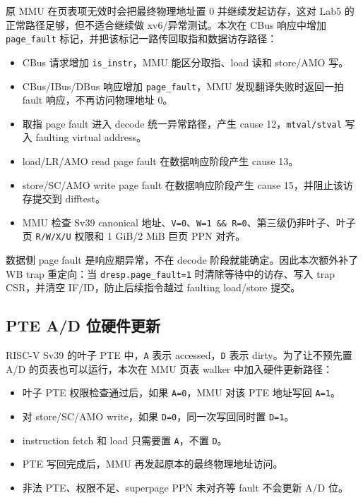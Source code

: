 \documentclass[UTF8,a4paper,11pt]{ctexart}
\begin{document}
原 MMU 在页表项无效时会把最终物理地址置 0 并继续发起访存，这对 Lab5 的正常路径足够，但不适合继续做 xv6/异常测试。本次在 CBus 响应中增加 \texttt{page\_fault} 标记，并把该标记一路传回取指和数据访存路径：

\begin{itemize}
  \item CBus 请求增加 \texttt{is\_instr}，MMU 能区分取指、load 读和 store/AMO 写。
  \item CBus/IBus/DBus 响应增加 \texttt{page\_fault}，MMU 发现翻译失败时返回一拍 fault 响应，不再访问物理地址 0。
  \item 取指 page fault 进入 decode 统一异常路径，产生 cause 12，\texttt{mtval/stval} 写入 faulting virtual address。
  \item load/LR/AMO read page fault 在数据响应阶段产生 cause 13。
  \item store/SC/AMO write page fault 在数据响应阶段产生 cause 15，并阻止该访存提交到 difftest。
  \item MMU 检查 Sv39 canonical 地址、\texttt{V=0}、\texttt{W=1 \&\& R=0}、第三级仍非叶子、叶子页 \texttt{R/W/X/U} 权限和 1 GiB/2 MiB 巨页 PPN 对齐。
\end{itemize}

数据侧 page fault 是响应期异常，不在 decode 阶段就能确定。因此本次额外补了 WB trap 重定向：当 \texttt{dresp.page\_fault=1} 时清除等待中的访存、写入 trap CSR，并清空 IF/ID，防止后续指令越过 faulting load/store 提交。

\subsection{PTE A/D 位硬件更新}

RISC-V Sv39 的叶子 PTE 中，\texttt{A} 表示 accessed，\texttt{D} 表示 dirty。为了让不预先置 A/D 的页表也可以运行，本次在 MMU 页表 walker 中加入硬件更新路径：

\begin{itemize}
  \item 叶子 PTE 权限检查通过后，如果 \texttt{A=0}，MMU 对该 PTE 地址写回 \texttt{A=1}。
  \item 对 store/SC/AMO write，如果 \texttt{D=0}，同一次写回同时置 \texttt{D=1}。
  \item instruction fetch 和 load 只需要置 \texttt{A}，不置 \texttt{D}。
  \item PTE 写回完成后，MMU 再发起原本的最终物理地址访问。
  \item 非法 PTE、权限不足、superpage PPN 未对齐等 fault 不会更新 A/D 位。
\end{itemize}
\end{document}
